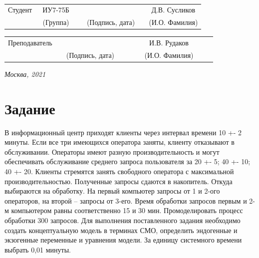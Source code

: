 \documentclass[14pt, a4paper]{extarticle}
\begin{document}
	
	\noindent
	
	\noindent
	\\
	
	\vspace{1.5cm}
	\noindent
	\begin{tabular}{l c c c c c}
		Студент      & ~ИУ7-75Б~               & \hspace{2.5cm} & \hspace{2cm}                 & &  Д.В. 
		Сусликов \\\cline{2-2}\cline{4-4} \cline{6-6} 
		\hspace{3cm} & {\footnotesize(Группа)} &                & {\footnotesize(Подпись, дата)} & & {\footnotesize(И.О. Фамилия)}
	\end{tabular}
	
	\noindent
	\begin{tabular}{l c c c c}
		Преподаватель & \hspace{5cm}   & \hspace{2cm}                 & & ~~~~~~И.В. Рудаков~~~~~~\\\cline{3-3} \cline{5-5} 
		\hspace{3cm}  &                & {\footnotesize(Подпись, дата)} & & {\footnotesize(И.О. Фамилия)}
	\end{tabular}
	
	\vspace{0.6cm}
	\begin{center}	
		\vfill
		\large \textit {Москва, 2021}
	\end{center}
	
	\thispagestyle {empty}
	\pagebreak
	
	\clearpage
	\tableofcontents
		
	\clearpage
	\section*{Задание}
	В информационный центр приходят клиенты через интервал времени 10 +- 2 минуты. Если все три имеющихся оператора заняты, клиенту отказывают в обслуживании. Операторы имеют разную производительность и могут обеспечивать обслуживание среднего запроса пользователя за 20 +- 5; 40 +- 10; 40 +- 20. Клиенты стремятся занять свободного оператора с максимальной производительностью. Полученные запросы сдаются в накопитель. Откуда выбираются на обработку. На первый компьютер запросы от 1 и 2-ого операторов, на второй – запросы от 3-его. Время обработки запросов первым и 2-м компьютером равны соответственно 15 и 30 мин. Промоделировать процесс обработки 300 запросов. 
	Для выполнения поставленного задания необходимо создать концептуальную модель в терминах СМО, определить эндогенные и экзогенные переменные и уравнения модели. За единицу системного времени выбрать 0,01 минуты.
\end{document}
